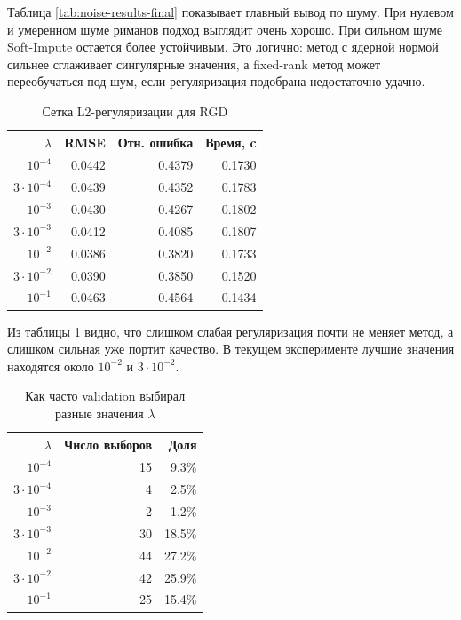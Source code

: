 \documentclass[a4paper,12pt]{article}
\begin{document}
Таблица \ref{tab:noise-results-final} показывает главный вывод по шуму. При нулевом и умеренном шуме риманов подход выглядит очень хорошо. При сильном шуме Soft-Impute остается более устойчивым. Это логично: метод с ядерной нормой сильнее сглаживает сингулярные значения, а fixed-rank метод может переобучаться под шум, если регуляризация подобрана недостаточно удачно.

\begin{table}[H]
    \centering
    \small
    \caption{Сетка L2-регуляризации для RGD}
    \label{tab:l2-sweep-final}
    \begin{tabular}{rrrr}
        \toprule
        $\lambda$       & RMSE   & Отн. ошибка & Время, c \\
        \midrule
        $10^{-4}$       & 0.0442 & 0.4379      & 0.1730   \\
        $3\cdot10^{-4}$ & 0.0439 & 0.4352      & 0.1783   \\
        $10^{-3}$       & 0.0430 & 0.4267      & 0.1802   \\
        $3\cdot10^{-3}$ & 0.0412 & 0.4085      & 0.1807   \\
        $10^{-2}$       & 0.0386 & 0.3820      & 0.1733   \\
        $3\cdot10^{-2}$ & 0.0390 & 0.3850      & 0.1520   \\
        $10^{-1}$       & 0.0463 & 0.4564      & 0.1434   \\
        \bottomrule
    \end{tabular}
\end{table}

Из таблицы \ref{tab:l2-sweep-final} видно, что слишком слабая регуляризация почти не меняет метод, а слишком сильная уже портит качество. В текущем эксперименте лучшие значения находятся около $10^{-2}$ и $3\cdot10^{-2}$.

\begin{table}[H]
    \centering
    \small
    \caption{Как часто validation выбирал разные значения $\lambda$}
    \label{tab:selected-lambda-final}
    \begin{tabular}{rrr}
        \toprule
        $\lambda$       & Число выборов & Доля   \\
        \midrule
        $10^{-4}$       & 15            & 9.3\%  \\
        $3\cdot10^{-4}$ & 4             & 2.5\%  \\
        $10^{-3}$       & 2             & 1.2\%  \\
        $3\cdot10^{-3}$ & 30            & 18.5\% \\
        $10^{-2}$       & 44            & 27.2\% \\
        $3\cdot10^{-2}$ & 42            & 25.9\% \\
        $10^{-1}$       & 25            & 15.4\% \\
        \bottomrule
    \end{tabular}
\end{table}
\end{document}
